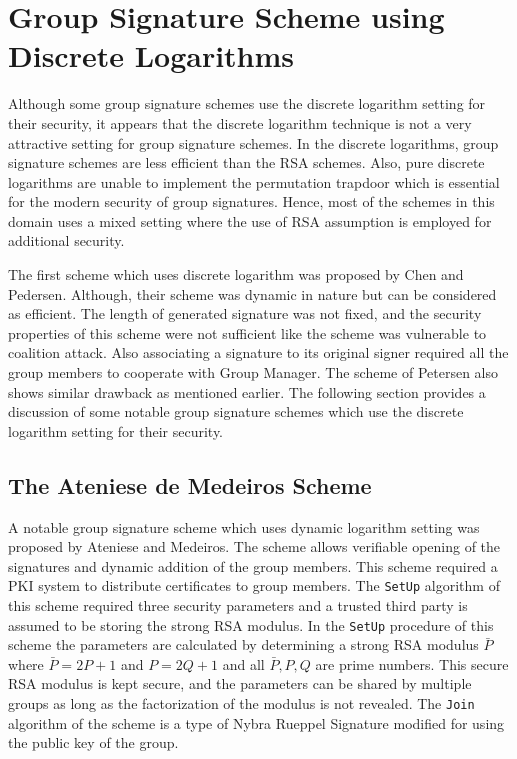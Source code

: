 \section[Group Signature Scheme using Discrete Logarithms]{Group Signature Scheme using \\ Discrete Logarithms}
Although some group signature schemes use the discrete logarithm setting for their security, it appears that the discrete logarithm technique is not a very attractive setting for group signature schemes. In the discrete logarithms, group signature schemes are less efficient than the RSA schemes. Also, pure discrete logarithms are unable to implement the permutation trapdoor which is essential for the modern security of group signatures. Hence, most of the schemes in this domain uses a mixed setting where the use of RSA assumption is employed for additional security. 

The first scheme which uses discrete logarithm was proposed by Chen and Pedersen\cite{chen1994new}. Although, their scheme was dynamic in nature but can be considered as efficient. The length of generated signature was not fixed, and the security properties of this scheme were not sufficient like the scheme was vulnerable to coalition attack. Also associating a signature to its original signer required all the group members to cooperate with Group Manager. The scheme of Petersen also shows similar drawback as mentioned earlier\cite{petersen1998convert}. The following section provides a discussion of some notable group signature schemes which use the discrete logarithm setting for their security.

\subsection{The Ateniese de Medeiros Scheme}\label{AM}
A notable group signature scheme which uses dynamic logarithm setting was proposed by Ateniese and Medeiros\cite{ateniese2003efficient}. The scheme allows verifiable opening of the signatures and dynamic addition of the group members. This scheme required a PKI system to distribute certificates to group members. The \texttt{SetUp} algorithm of this scheme required three security parameters and a trusted third party is assumed to be storing the strong RSA modulus. In the \texttt{SetUp} procedure of this scheme the parameters are calculated by determining a strong RSA modulus $\bar{P}$ where $\bar{P}= 2P + 1$ and $P= 2Q + 1$  and all $\bar{P}, P, Q$ are prime numbers. This secure RSA modulus is kept secure, and the parameters can be shared by multiple groups as long as the factorization of the modulus is not revealed. The \texttt{Join} algorithm of the scheme is a type of Nybra Rueppel Signature\cite{nyberg1996message} modified for using the public key of the group. 

